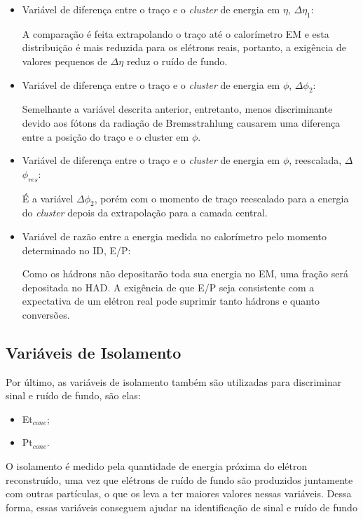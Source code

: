 \begin{itemize}
  \item Variável de diferença entre o traço e o \emph{cluster} de energia em $\eta$, $\Delta$$\eta_1$:

  A comparação é feita extrapolando o traço até o calorímetro EM e esta distribuição é mais reduzida para os elétrons reais, portanto, a exigência de valores pequenos de $\Delta$$\eta$ reduz o ruído de fundo.

  \item Variável de diferença entre o traço e o \emph{cluster} de energia em $\phi$, $\Delta$$\phi_2$:

  Semelhante a variável descrita anterior, entretanto, menos discriminante devido aos fótons da radiação de Bremsstrahlung causarem uma diferença entre a posição do traço e o cluster em $\phi$.

  \item Variável de diferença entre o traço e o \emph{cluster} de energia em $\phi$, reescalada, $\Delta$$\phi_{res}$:

  É a variável $\Delta$$\phi_2$, porém com o momento de traço reescalado para a energia do \emph{cluster} depois da extrapolação para a camada central.

  \item Variável de razão entre a energia medida no calorímetro pelo momento determinado no ID, E/P:

  Como os hádrons não depositarão toda sua energia no EM, uma fração será depositada no HAD. A exigência de que E/P seja consistente com a expectativa de um elétron real pode suprimir tanto hádrons e quanto conversões.

\end{itemize}

\subsection{Variáveis de Isolamento}

Por último, as variáveis de isolamento também são utilizadas para discriminar sinal e ruído de fundo, são elas:

\begin{itemize}
  \item Et$_{cone}$;
  \item Pt$_{cone}$.
\end{itemize}

O isolamento é medido pela quantidade de energia próxima do elétron reconstruído, uma vez que elétrons de ruído de fundo são produzidos juntamente com outras partículas, o que os leva a ter maiores valores nessas variáveis. Dessa forma, essas variáveis conseguem ajudar na identificação de sinal e ruído de fundo

